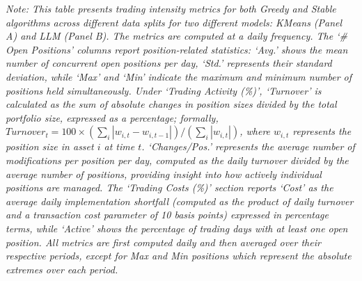 \begin{table}[htbp]
\begin{subtable}{\textwidth}
{%
}
\end{subtable}

\vspace{0.5cm}
\begin{minipage}{\textwidth}
\setlength{\parindent}{0pt}
\small\textit{Note: 
This table presents trading intensity metrics for both Greedy and Stable algorithms across different data splits for two different models: KMeans (Panel A) and LLM (Panel B). 
The metrics are computed at a daily frequency. The `\# Open Positions' columns report position-related statistics: 
`Avg.' shows the mean number of concurrent open positions per day, `Std.' represents their standard deviation, while 
`Max' and `Min' indicate the maximum and minimum number of positions held simultaneously. Under `Trading Activity (\%)', 
`Turnover' is calculated as the sum of absolute changes in position sizes divided by the total portfolio size, expressed 
as a percentage; formally, $Turnover_t = 100 \times (\sum_i |w_{i,t} - w_{i,t-1}|)/(\sum_i |w_{i,t}|)$, where $w_{i,t}$ 
represents the position size in asset $i$ at time $t$. `Changes/Pos.' represents the average number of modifications per 
position per day, computed as the daily turnover divided by the average number of positions, providing insight into how 
actively individual positions are managed. 
The `Trading Costs (\%)' section reports `Cost' as the average daily implementation shortfall (computed as the product of daily turnover and a transaction cost parameter of 10 basis points)
expressed in percentage terms, while `Active' shows the percentage of trading days with at least one open position.
%
All metrics are first computed daily and then averaged over their respective periods, except for Max and Min positions which represent the absolute extremes over each period.
}
\end{minipage}
\end{table}